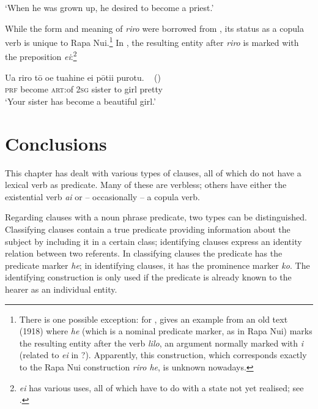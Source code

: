 \glt 
‘When he was grown up, he desired to become a priest.’ \textstyleExampleref{[R231.004]} 
\z

While the form and meaning of \textit{riro} were borrowed from , its status as a copula verb is unique to Rapa Nui.\footnote{\label{fn:482}There is one possible exception: for , \citet[63]{Cook1999} gives an example from an old text (1918) where \textit{he} (which is a nominal predicate marker, as in Rapa Nui) marks the resulting entity after the verb \textit{lilo}, an argument normally marked with \textit{i} (related to  \textit{{\ꞌ}ei} in ?). Apparently, this construction, which corresponds exactly to the Rapa Nui construction \textit{riro he}, is unknown nowadays.} In , the resulting entity after \textit{riro} is marked with the preposition \textit{{\ꞌ}ei}:\footnote{\label{fn:483} \textit{{\ꞌ}ei} has various uses, all of which have to do with a state not yet realised; see \citet[364–365]{AcadémieTahitienne1986}.}

\ea\label{ex:9.110}
\gll {\ꞌ}Ua riro tō {\ꞌ}oe tuahine {\ꞌ}ei pōti{\ꞌ}i purotu. ~ \textup{()}\\
\textsc{prf} become \textsc{art}:of \textsc{2sg} sister to girl pretty \\

\glt 
‘Your sister has become a beautiful girl.’  
\z
{}

\section{Conclusions}\label{sec:9.7}

This chapter has dealt with various types of clauses, all of which do not have a lexical verb as predicate. Many of these are verbless; others have either the existential verb \textit{ai} or – occasionally – a copula verb.

Regarding clauses with a noun phrase predicate, two types can be distinguished. Classifying clauses contain a true predicate providing information about the subject by including it in a certain class; identifying clauses express an identity relation between two referents. In classifying clauses the predicate has the predicate marker \textit{he}; in identifying clauses, it has the prominence marker \textit{ko}. The identifying construction is only used if the predicate is already known to the hearer as an individual entity.

